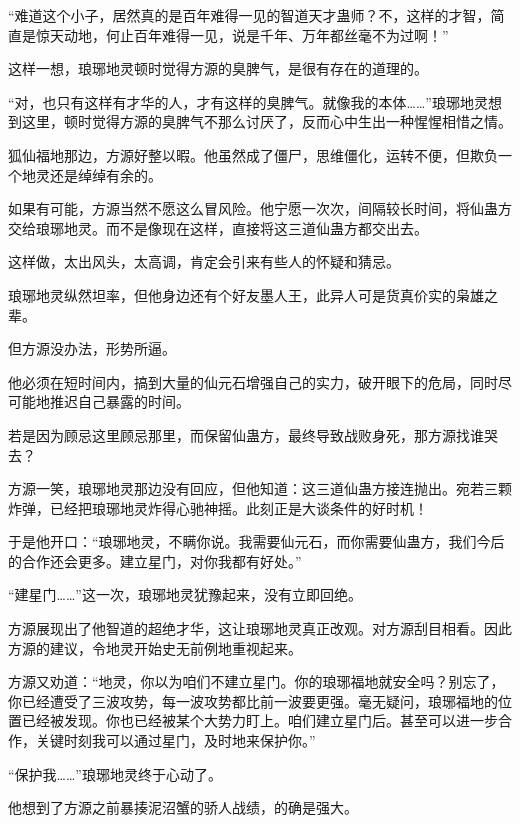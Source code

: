 
\begin{this_body}



“难道这个小子，居然真的是百年难得一见的智道天才蛊师？不，这样的才智，简直是惊天动地，何止百年难得一见，说是千年、万年都丝毫不为过啊！”

这样一想，琅琊地灵顿时觉得方源的臭脾气，是很有存在的道理的。

“对，也只有这样有才华的人，才有这样的臭脾气。就像我的本体……”琅琊地灵想到这里，顿时觉得方源的臭脾气不那么讨厌了，反而心中生出一种惺惺相惜之情。

狐仙福地那边，方源好整以暇。他虽然成了僵尸，思维僵化，运转不便，但欺负一个地灵还是绰绰有余的。

如果有可能，方源当然不愿这么冒风险。他宁愿一次次，间隔较长时间，将仙蛊方交给琅琊地灵。而不是像现在这样，直接将这三道仙蛊方都交出去。

这样做，太出风头，太高调，肯定会引来有些人的怀疑和猜忌。

琅琊地灵纵然坦率，但他身边还有个好友墨人王，此异人可是货真价实的枭雄之辈。

但方源没办法，形势所逼。

他必须在短时间内，搞到大量的仙元石增强自己的实力，破开眼下的危局，同时尽可能地推迟自己暴露的时间。

若是因为顾忌这里顾忌那里，而保留仙蛊方，最终导致战败身死，那方源找谁哭去？

方源一笑，琅琊地灵那边没有回应，但他知道：这三道仙蛊方接连抛出。宛若三颗炸弹，已经把琅琊地灵炸得心驰神摇。此刻正是大谈条件的好时机！

于是他开口：“琅琊地灵，不瞒你说。我需要仙元石，而你需要仙蛊方，我们今后的合作还会更多。建立星门，对你我都有好处。”

“建星门……”这一次，琅琊地灵犹豫起来，没有立即回绝。

方源展现出了他智道的超绝才华，这让琅琊地灵真正改观。对方源刮目相看。因此方源的建议，令地灵开始史无前例地重视起来。

方源又劝道：“地灵，你以为咱们不建立星门。你的琅琊福地就安全吗？别忘了，你已经遭受了三波攻势，每一波攻势都比前一波要更强。毫无疑问，琅琊福地的位置已经被发现。你也已经被某个大势力盯上。咱们建立星门后。甚至可以进一步合作，关键时刻我可以通过星门，及时地来保护你。”

“保护我……”琅琊地灵终于心动了。

他想到了方源之前暴揍泥沼蟹的骄人战绩，的确是强大。


\end{this_body}
